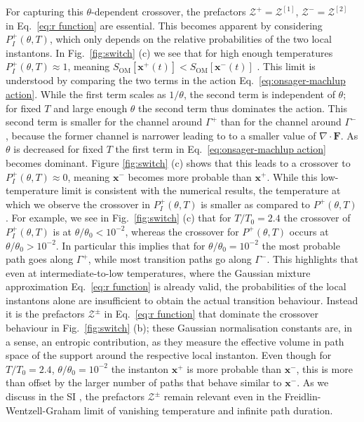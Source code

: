 For capturing this $\theta$-dependent crossover, the prefactors $\mathcal{Z}^{+}=\mathcal{Z}^{[1]}$,
$\mathcal{Z}^{-}=\mathcal{Z}^{[2]}$ in Eq.~\eqref{eq:r function}
are essential. This becomes apparent by considering $P_{I}^{+}(\theta,T)$,
which only depends on the relative probabilities of the two local
instantons. In Fig.~\ref{fig:switch} (c) we see that for high enough
temperatures $P_{I}^{+}(\theta,T)\approx1$, meaning $S_{\text{OM}}[\mathbf{x}^{+}(t)]<S_{\text{OM}}[\mathbf{x}^{-}(t)]$
\citep{adibStochasticActionsDiffusive2008}. This limit is understood
by comparing the two terms in the action Eq.~\eqref{eq:onsager-machlup action}.
While the first term scales as $1/\theta$, the second term is independent
of $\theta$; for fixed $T$ and large enough $\theta$ the second
term thus dominates the action. This second term is smaller for the
channel around $\Gamma^{+}$ than for the channel around $\Gamma^{-}$,
because the former channel is narrower leading to to a smaller value
of $\nabla\cdot\mathbf{F}$. As $\theta$ is decreased for fixed $T$
the first term in Eq.~\eqref{eq:onsager-machlup action} becomes
dominant. Figure \ref{fig:switch} (c) shows that this leads to a
crossover to $P_{I}^{+}(\theta,T)\approx0$, meaning $\mathbf{x}^{-}$
becomes more probable than $\mathbf{x}^{+}$. While this low-temperature
limit is consistent with the numerical results, the temperature at
which we observe the crossover in $P_{I}^{+}(\theta,T)$ is smaller
as compared to $P^{+}(\theta,T)$. For example, we see in Fig.~\ref{fig:switch}
(c) that for $T/T_{0}=2.4$ the crossover of $P_{I}^{+}(\theta,T)$
is at $\theta/\theta_{0}<10^{-2}$, whereas the crossover for $P^{+}(\theta,T)$
occurs at $\theta/\theta_{0}>10^{-2}$. In particular this implies
that for $\theta/\theta_{0}=10^{-2}$ the most probable path goes
along $\Gamma^{+}$, while most transition paths go along $\Gamma^{-}$.
This highlights that even at intermediate-to-low temperatures, where
the Gaussian mixture approximation Eq.~\eqref{eq:r function} is
already valid, the probabilities of the local instantons alone are
insufficient to obtain the actual transition behaviour. Instead it
is the prefactors $\mathcal{Z^{\pm}}$ in Eq.~\eqref{eq:r function}
that dominate the crossover behaviour in Fig.~\ref{fig:switch} (b);
these Gaussian normalisation constants are, in a sense, an entropic
contribution, as they measure the effective volume in path space of
the support around the respective local instanton. Even though for
$T/T_{0}=2.4$, $\theta/\theta_{0}=10^{-2}$ the instanton $\mathbf{x}^{+}$
is more probable than $\mathbf{x}^{-}$, this is more than offset
by the larger number of paths that behave similar to $\mathbf{x}^{-}$.
As we discuss in the SI \citep{note:SI}, the prefactors $\mathcal{Z^{\pm}}$
remain relevant even in the Freidlin-Wentzell-Graham limit \citep{ventselSMALLRANDOMPERTURBATIONS1970,grahamMacroscopicPotentialsBifurcations1989}
of vanishing temperature and infinite path duration.

